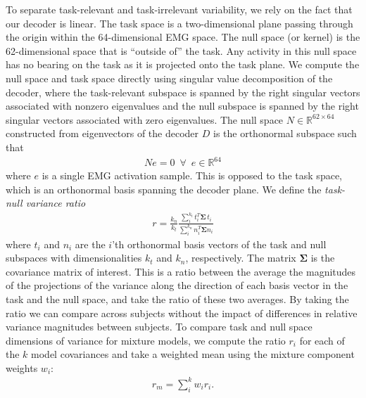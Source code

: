 \documentclass[../main.tex]{subfiles}
\begin{document}
  To separate task-relevant and task-irrelevant variability, we rely on the fact that our decoder is linear. The task space is a two-dimensional plane passing through the origin within the 64-dimensional EMG space. The null space (or kernel) is the 62-dimensional space that is ``outside of'' the task. Any activity in this null space has no bearing on the task as it is projected onto the task plane. We compute the null space and task space directly using singular value decomposition of the decoder, where the task-relevant subspace is spanned by the right singular vectors associated with nonzero eigenvalues and the null subspace is spanned by the right singular vectors associated with zero eigenvalues. The null space $N\in\mathbb{R}^{62\times64}$ constructed from eigenvectors of the decoder $D$ is the orthonormal subspace such that
  \begin{align}
    Ne = 0 \,\,\, \forall \,\,\, e \in \mathbb{R}^{64}
  \end{align}
  where $e$ is a single EMG activation sample. This is opposed to the task space, which is an orthonormal basis spanning the decoder plane. We define the \textit{task-null variance ratio}
  \begin{align}
    r = \frac{k_n}{k_t}\frac{\sum_i^{k_t}{t_i^T \bm{\Sigma}\, t_i}}{\sum_i^{k_n}{n_i^T \bm{\Sigma} n_i}}
  \end{align}
  where $t_i$ and $n_i$ are the $i$'th orthonormal basis vectors of the task and null subspaces with dimensionalities $k_t$ and $k_n$, respectively. The matrix $\bm{\Sigma}$ is the covariance matrix of interest. This is a ratio between the average the magnitudes of the projections of the variance along the direction of each basis vector in the task and the null space, and take the ratio of these two averages. By taking the ratio we can compare across subjects without the impact of differences in relative variance magnitudes between subjects. To compare task and null space dimensions of variance for mixture models, we compute the ratio $r_i$ for each of the $k$ model covariances and take a weighted mean using the mixture component weights $w_i$:
  \begin{align}
    r_m = \sum_{i}^{k}w_ir_i.
  \end{align}
\end{document}
